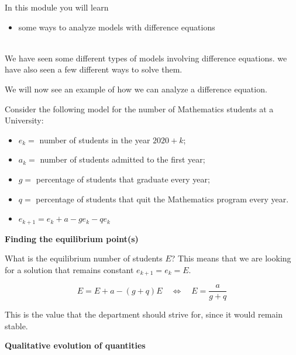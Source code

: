 In this module you will learn
\begin{itemize}
	\item some ways to analyze models with difference equations
\end{itemize}

\hfill \\




We have seen some different types of models involving difference equations. we have also seen a few different ways to solve them.

We will now see an example of how we can analyze a difference equation.



\begin{example}

Consider the following model for the number of Mathematics students at a University:
\begin{itemize}
\item $e_k = $ number of students in the year $2020+k$;
\item $a_k = $ number of students admitted to the first year;
\item $g = $ percentage of students that graduate every year;
\item $q = $ percentage of students that quit the Mathematics program  every year. \\

\item $e_{k+1} = e_k + a - g e_k - q e_k$
\end{itemize}

\end{example}

\hfill

\begin{center}
\textbf{\color{cyan}
Finding the equilibrium point(s)
}
\end{center}


What is the equilibrium number of students $E$? This means that we are looking for a solution that remains constant $e_{k+1}=e_k = E$.

$$
E = E + a - (g+q)E
\quad \Leftrightarrow\quad
	E = \frac{a}{g+q}
$$

This is the value that the department should strive for, since it would remain stable.



\hfill

\begin{center}
\textbf{\color{cyan}
Qualitative evolution of quantities
}
\end{center}



